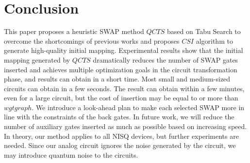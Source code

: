 \documentclass[runningheads]{llncs}
\begin{document}
 \section{Conclusion}
 \label{Conclusion}
 This paper proposes a heuristic SWAP method $QCTS$ based on Tabu Search to overcome the shortcomings of previous works and proposes $CSI$  algorithm to generate high-quality initial mapping.  Experimental results show that the initial mapping generated by $QCTS$ dramatically reduces the number of SWAP gates inserted  and achieves multiple optimization goals in the circuit transformation phase,  and results can obtain in a short time.  Most small and medium-sized circuits can obtain in a few seconds. The result can obtain within a few minutes, even for a large circuit, but the cost of insertion may be equal to or more than $wgtgraph$. We introduce a look-ahead plan to make each selected SWAP more in line with the constraints of the back gates.  In future work, we will reduce the number of auxiliary gates inserted as much as possible based on increasing speed. In theory, our method applies to all NISQ devices,  but further experiments are needed. Since our analog circuit ignores the noise generated by the circuit, we may introduce quantum noise to the circuits.

\appendix
\end{document}
